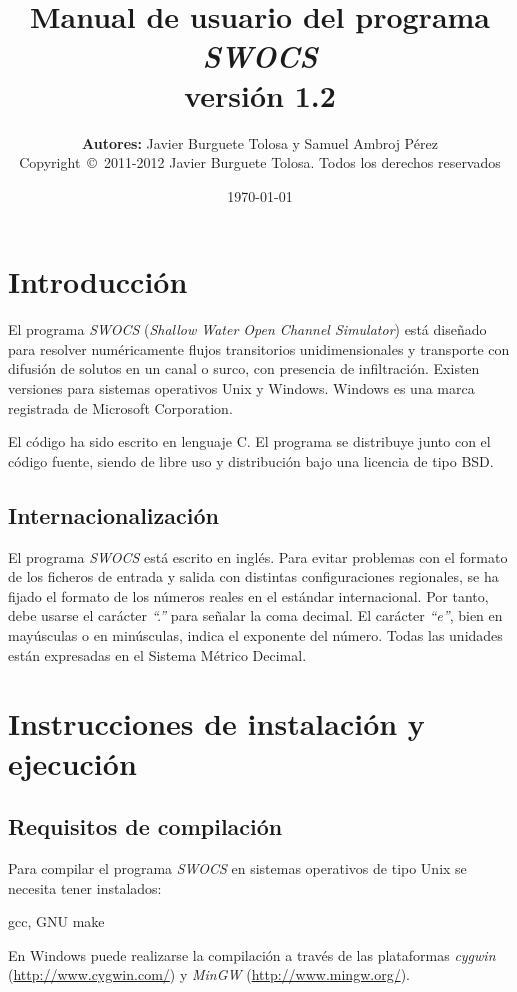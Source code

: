 \documentclass[a4paper,12pt]{report}
\title
{
	{\bf \Large Manual de usuario del programa \emph{SWOCS}}\\
	{\large	versión 1.2}
}
\author
{
	{\bf Autores:} Javier Burguete Tolosa y Samuel Ambroj Pérez\\
	{\small Copyright~\copyright~2011-2012 Javier Burguete Tolosa.
	Todos los derechos reservados}
}
\date{\today}
\newcommand{\swocs}{\emph{SWOCS}}
\newcommand{\IT}[1]{{\sl ``#1''}}
\begin{document}
\maketitle

\tableofcontents

\setlength{\parskip}{\baselineskip / 2}

\chapter{Introducción}

El programa {\swocs} ({\it Shallow Water Open Channel Simulator}) está diseñado para resolver numéricamente flujos
transitorios unidimensionales y transporte con difusión de solutos en un canal
o surco, con presencia de infiltración. 
Existen versiones para sistemas operativos Unix y Windows. Windows es una 
marca registrada de Microsoft Corporation.

El código ha sido escrito en lenguaje C. El programa se distribuye junto con 
el código fuente, siendo de libre uso y distribución bajo una licencia de tipo BSD.  

\section{Internacionalización}

El programa {\swocs} está escrito en inglés. Para evitar problemas con
el formato de los ficheros de entrada y salida con distintas configuraciones
regionales, se ha fijado el formato de los números reales en el estándar
internacional. Por tanto, debe usarse el carácter \IT{.} para señalar la coma
decimal. El carácter \IT{e}, bien en mayúsculas o en minúsculas, indica el
exponente del número. Todas las unidades están expresadas en el Sistema
Métrico Decimal.

\chapter{Instrucciones de instalación y ejecución}

\section{Requisitos de compilación}
Para compilar el programa {\swocs} en sistemas operativos de tipo Unix se
necesita tener instalados:
\begin{verbatimtab}
	gcc, GNU make
\end{verbatimtab}
En Windows puede realizarse la compilación a través de las plataformas
\emph{cygwin} (\url{http://www.cygwin.com/}) y \emph{MinGW}
(\url{http://www.mingw.org/}). 
\end{document}
